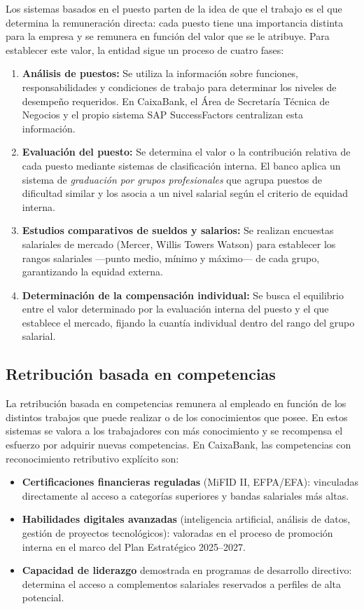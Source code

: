 Los sistemas basados en el puesto parten de la idea de que el trabajo es el que determina la remuneración directa: cada puesto tiene una importancia distinta para la empresa y se remunera en función del valor que se le atribuye. Para establecer este valor, la entidad sigue un proceso de cuatro fases:

\begin{enumerate}
    \item \textbf{Análisis de puestos:} Se utiliza la información sobre funciones, responsabilidades y condiciones de trabajo para determinar los niveles de desempeño requeridos. En CaixaBank, el Área de Secretaría Técnica de Negocios y el propio sistema SAP SuccessFactors centralizan esta información.
    \item \textbf{Evaluación del puesto:} Se determina el valor o la contribución relativa de cada puesto mediante sistemas de clasificación interna. El banco aplica un sistema de \textit{graduación por grupos profesionales} que agrupa puestos de dificultad similar y los asocia a un nivel salarial según el criterio de equidad interna.
    \item \textbf{Estudios comparativos de sueldos y salarios:} Se realizan encuestas salariales de mercado (Mercer, Willis Towers Watson) para establecer los rangos salariales —punto medio, mínimo y máximo— de cada grupo, garantizando la equidad externa.
    \item \textbf{Determinación de la compensación individual:} Se busca el equilibrio entre el valor determinado por la evaluación interna del puesto y el que establece el mercado, fijando la cuantía individual dentro del rango del grupo salarial.
\end{enumerate}

\subsection{Retribución basada en competencias}

La retribución basada en competencias remunera al empleado en función de los distintos trabajos que puede realizar o de los conocimientos que posee. En estos sistemas se valora a los trabajadores con más conocimiento y se recompensa el esfuerzo por adquirir nuevas competencias. En CaixaBank, las competencias con reconocimiento retributivo explícito son:

\begin{itemize}
    \item \textbf{Certificaciones financieras reguladas} (MiFID II, EFPA/EFA): vinculadas directamente al acceso a categorías superiores y bandas salariales más altas.
    \item \textbf{Habilidades digitales avanzadas} (inteligencia artificial, análisis de datos, gestión de proyectos tecnológicos): valoradas en el proceso de promoción interna en el marco del Plan Estratégico 2025--2027.
    \item \textbf{Capacidad de liderazgo} demostrada en programas de desarrollo directivo: determina el acceso a complementos salariales reservados a perfiles de alta potencial.
\end{itemize}

